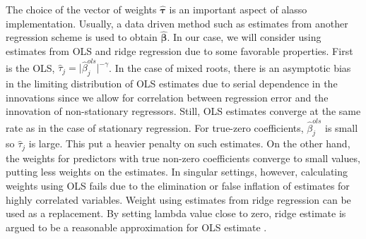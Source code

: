 \documentclass[12pt,a4paper]{article}
\begin{document}
The choice of the vector of weights $ \hat{\bm{\tau}} $ is an important aspect of alasso implementation. Usually, a data driven method such as estimates from another regression scheme is used to obtain $ \hat{\bm{\beta}}$. In our case, we will consider using estimates from OLS and ridge regression due to some favorable properties. First is the OLS, $ \hat{\tau}_j = \vert\hat{\beta}_j^{ols}\vert^{-\gamma} $. In the case of mixed roots, there is an asymptotic bias in the limiting distribution of OLS estimates due to serial dependence in the innovations since we allow for correlation between regression error and the innovation of non-stationary regressors. Still, OLS estimates converge at the same rate as in the case of stationary regression. For true-zero coefficients, $ \hat{\beta}_j^{ols} $ is small so $ \hat{\tau}_j $ is large. This put a heavier penalty on such estimates. On the other hand, the weights for predictors with true non-zero coefficients converge to small values, putting less weights on the estimates. In singular settings, however, calculating weights using OLS fails due to the elimination or false inflation of estimates for highly correlated variables. Weight using estimates from ridge regression can be used as a replacement. By setting lambda value close to zero, ridge estimate is argued to be a reasonable approximation for OLS estimate \citep{knight2000asymptotics}.
\end{document}
